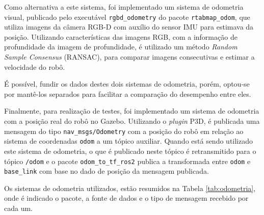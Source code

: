 \documentclass[repeatfields,xlists,xpacks,oneside,yearsonly]{ufrgscca}
\begin{document}

Como alternativa a este sistema, foi implementado um sistema de
odometria visual, publicado pelo executável \texttt{rgbd\_odometry}
do pacote \texttt{rtabmap\_odom}, que utiliza imagens da câmera RGB-D
com auxílio do sensor IMU para estimava da posição. Utilizando
características das imagens RGB, com a informação de profundidade da
imagem de profundidade, é utilizado um método \textit{Random Sample
    Consensus} (RANSAC), para comparar imagens consecutivas e estimar a
velocidade do robô\cite{rtabmap_odom}.

É possível, fundir os dados destes dois sistemas de odometria,
porém, optou-se por mantê-los separados para facilitar a comparação
do desempenho entre eles.

Finalmente, para realização de testes, foi implementado um sistema de
odometria com a posição real do robô no Gazebo. Utilizando o
\textit{plugin} P3D, é publicada uma mensagem do tipo
\texttt{nav\_msgs/Odometry} com a posição do robô em relação ao
sistema de coordenadas \texttt{odom} a um tópico auxiliar. Quando
está sendo utilizado este sistema de odometria, o que é publicado
neste tópico é retransmitido para o tópico \texttt{/odom} e o pacote
\texttt{odom\_to\_tf\_ros2} publica a transformada entre
\texttt{odom} e \texttt{base\_link} com base no dado de posição da
mensagem publicada.

Os sistemas de odometria utilizados, estão resumidos na Tabela
\ref{tab:odometria}, onde é indicado o pacote, a fonte de dados e o
tipo de mensagem recebido por cada um.
\end{document}
